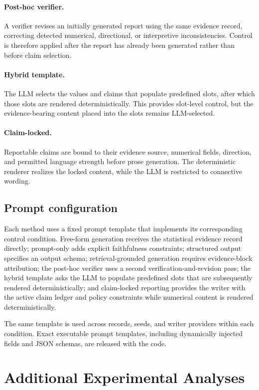 \documentclass[10pt,twocolumn]{article}
\begin{document}
\paragraph{Post-hoc verifier.} A verifier revises an initially generated report using the same evidence record, correcting detected numerical, directional, or interpretive inconsistencies. Control is therefore applied after the report has already been generated rather than before claim selection.

\paragraph{Hybrid template.} The LLM selects the values and claims that populate predefined slots, after which those slots are rendered deterministically. This provides slot-level control, but the evidence-bearing content placed into the slots remains LLM-selected.

\paragraph{Claim-locked.} Reportable claims are bound to their evidence source, numerical fields, direction, and permitted language strength before prose generation. The deterministic renderer realizes the locked content, while the LLM is restricted to connective wording.
\subsection{Prompt configuration}
\label{app:prompts}

Each method uses a fixed prompt template that implements its corresponding control condition. Free-form generation receives the statistical evidence
record directly; prompt-only adds explicit faithfulness constraints; structured output specifies an output schema; retrieval-grounded generation requires evidence-block attribution; the post-hoc verifier uses a second verification-and-revision pass; the hybrid template asks the LLM to populate predefined slots that are subsequently rendered deterministically; and claim-locked reporting provides the writer with the active claim ledger and policy constraints while numerical content is rendered deterministically.

The same template is used across records, seeds, and writer providers within each condition. Exact executable prompt templates, including dynamically injected fields and JSON schemas, are released with the code.
\section{Additional Experimental Analyses}
\label{app:additional-results}
\end{document}
